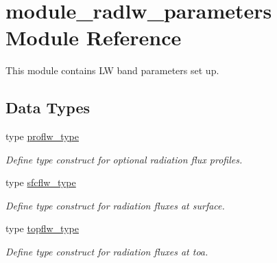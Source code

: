 \hypertarget{namespacemodule__radlw__parameters}{}\section{module\+\_\+radlw\+\_\+parameters Module Reference}
\label{namespacemodule__radlw__parameters}


This module contains LW band parameters set up.  


\subsection*{Data Types}
\begin{DoxyCompactItemize}
\item 
type \hyperlink{structmodule__radlw__parameters_1_1proflw__type}{proflw\+\_\+type}
\begin{DoxyCompactList}\small\item\em Define type construct for optional radiation flux profiles. \end{DoxyCompactList}\item 
type \hyperlink{structmodule__radlw__parameters_1_1sfcflw__type}{sfcflw\+\_\+type}
\begin{DoxyCompactList}\small\item\em Define type construct for radiation fluxes at surface. \end{DoxyCompactList}\item 
type \hyperlink{structmodule__radlw__parameters_1_1topflw__type}{topflw\+\_\+type}
\begin{DoxyCompactList}\small\item\em Define type construct for radiation fluxes at toa. \end{DoxyCompactList}\end{DoxyCompactItemize}
